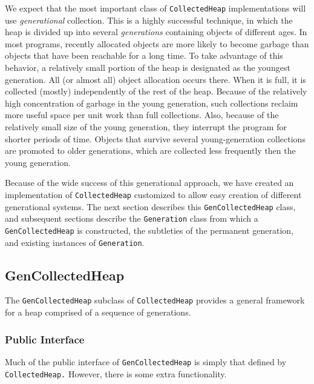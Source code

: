\documentclass{article}
\begin{document}
We expect that the most important class of {\tt CollectedHeap}
implementations will use {\em generational} collection.  This is a
highly successful technique, in which the heap is divided up into
several {\em generations} containing objects of different ages.  In
most programs, recently allocated objects are more likely to become
garbage than objects that have been reachable for a long time.  To
take advantage of this behavior, a relatively small portion of the
heap is designated as the youngest generation.  All (or almost all)
object allocation occurs there.  When it is full, it is collected
(mostly) independently of the rest of the heap.  Because of the
relatively high concentration of garbage in the young generation, such
collections reclaim more useful space per unit work than full
collections.  Also, because
of the relatively small size of the young generation, they interrupt
the program for shorter periods of time.  Objects that survive several
young-generation collections are promoted to older generations, which
are collected less frequently then the young generation.

Because of the wide success of this generational approach, we have
created an implementation of {\tt CollectedHeap} customized to allow
easy creation of different generational systems.  The next section
describes this {\tt GenCollectedHeap} class, and subsequent sections
describe the {\tt Generation} class from which a {\tt
GenCollectedHeap} is constructed, the subtleties of the permanent
generation, and existing instances of {\tt Generation}.

\subsection{GenCollectedHeap}

The {\tt GenCollectedHeap} subclass of {\tt CollectedHeap} provides a
general framework for a heap comprised of a sequence of generations.

\subsubsection{Public Interface}
\label{gch:public}

Much of the public interface of {\tt GenCollectedHeap} is simply that
defined by {\tt CollectedHeap.}  However, there is some extra functionality.
\end{document}
